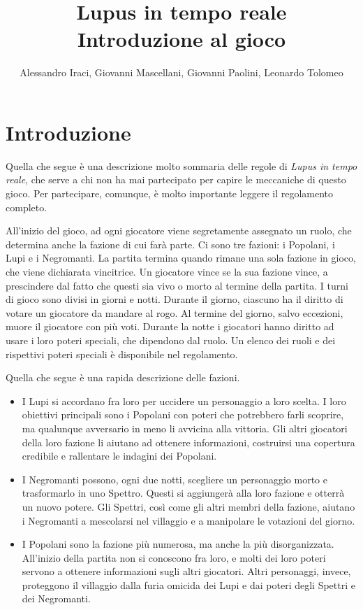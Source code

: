 \documentclass[a4paper,10pt]{article}
\title{Lupus in tempo reale\\ Introduzione al gioco}
\author{Alessandro Iraci, Giovanni Mascellani, Giovanni Paolini, Leonardo Tolomeo}
\begin{document}
\maketitle

\section{Introduzione}

Quella che segue è una descrizione molto sommaria delle regole di \emph{Lupus in tempo reale}, che serve a chi non ha mai partecipato per capire le meccaniche di questo gioco. Per partecipare, comunque, è molto importante leggere il regolamento completo.

All'inizio del gioco, ad ogni giocatore viene segretamente assegnato un ruolo, che determina anche la fazione di cui farà parte. Ci sono tre fazioni: i Popolani, i Lupi e i Negromanti. La partita termina quando rimane una sola fazione in gioco, che viene dichiarata vincitrice. Un giocatore vince se la sua fazione vince, a prescindere dal fatto che questi sia vivo o morto al termine della partita.
I turni di gioco sono divisi in giorni e notti. Durante il giorno, ciascuno ha il diritto di votare un giocatore da mandare al rogo. Al termine del giorno, salvo eccezioni, muore il giocatore con più voti. Durante la notte i giocatori hanno diritto ad usare i loro poteri speciali, che dipendono dal ruolo. Un elenco dei ruoli e dei rispettivi poteri speciali è disponibile nel regolamento.

Quella che segue è una rapida descrizione delle fazioni.

\begin{itemize}
 \item I Lupi si accordano fra loro per uccidere un personaggio a loro scelta. I loro obiettivi principali sono i Popolani con poteri che potrebbero farli scoprire, ma qualunque avversario in meno li avvicina alla vittoria.    Gli altri giocatori della loro fazione li aiutano ad ottenere informazioni, costruirsi una copertura credibile e rallentare le indagini dei Popolani.
 \item I Negromanti possono, ogni due notti, scegliere un personaggio morto e trasformarlo in uno Spettro. Questi si aggiungerà alla loro fazione e otterrà un nuovo potere. Gli Spettri, così come gli altri membri della fazione, aiutano i Negromanti a mescolarsi nel villaggio e a manipolare le votazioni del giorno.
 \item I Popolani sono la fazione più numerosa, ma anche la più disorganizzata. All'inizio della partita non si conoscono fra loro, e molti dei loro poteri servono a ottenere informazioni sugli altri giocatori. Altri personaggi, invece, proteggono il villaggio dalla furia omicida dei Lupi e dai poteri degli Spettri e dei Negromanti.
\end{itemize}
\end{document}

